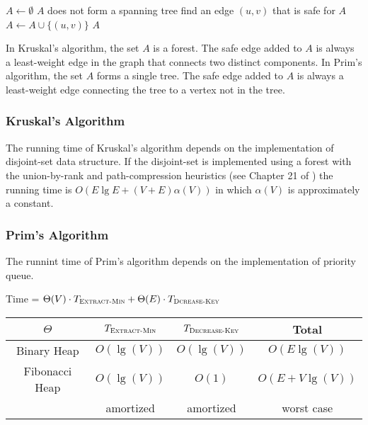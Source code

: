 \documentclass[12pt]{article}
\begin{document}
\begin{codebox}
\li $A \gets \emptyset$
\li \While $A$ does not form a spanning tree
\li     \Do find an edge $(u, v)$ that is safe for $A$
\li         $A \gets A \cup \{(u, v)\}$
        \End
\li \Return $A$
\end{codebox}

In Kruskal's algorithm, the set $A$ is a forest.  The safe edge added to
$A$ is always a least-weight edge in the graph that connects two distinct
components.  In Prim's algorithm, the set $A$ forms a single tree.  The
safe edge added to $A$ is always a least-weight edge connecting the tree to
a vertex not in the tree.

\subsubsection{Kruskal's Algorithm}

The running time of Kruskal's algorithm depends on the implementation of
disjoint-set data structure.  If the disjoint-set is implemented using a
forest with the union-by-rank and path-compression heuristics (see Chapter
21 of \cite{clrs2}) the running time is $O(E\lg E + (V+E)\alpha(V))$ in which
$\alpha(V)$ is approximately a constant.

\subsubsection{Prim's Algorithm}

The runnint time of Prim's algorithm depends on the implementation of
priority queue.

Time = $\Theta(V)\cdot T_{\textnormal{\scshape Extract-Min}} + 
        \Theta(E)\cdot T_{\textnormal{\scshape Dcrease-Key}}$

\begin{center}
\begin{tabular}{c c c c}
    \hline
    $\Theta$ & $T_{\textnormal{\scshape Extract-Min}}$ & $T_{\textnormal{\scshape Decrease-Key}}$ & Total \\
    \hline
    Binary Heap     & $O(\lg(V))$ & $O(\lg(V))$ & $O(E\lg(V))$   \\
    Fibonacci Heap  & $O(\lg(V))$ & $O(1)$       & $O(E+V\lg(V))$ \\
                    & amortized   & amortized    & worst case      \\
    \hline
\end{tabular}
\end{center}
                  
\end{document}
